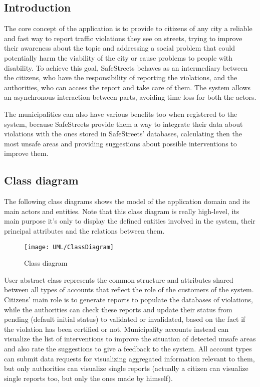 \subsection{Introduction}
The core concept of the application is to provide to citizens of any city a reliable and fast way to report traffic violations they see on streets, trying to improve their awareness about the topic and addressing a social problem that could potentially harm the viability of the city or cause problems to people with disability. To achieve this goal, SafeStreets behaves as an intermediary between the citizens, who have the responsibility of reporting the violations, and the authorities, who can access the report and take care of them. The system allows an asynchronous interaction between parts, avoiding time loss for both the actors.

The municipalities can also have various benefits too when registered to the system, because SafeStreets provide them a way to integrate their data about violations with the ones stored in SafeStreets' databases, calculating then the most unsafe areas and providing suggestions about possible interventions to improve them.

\subsection{Class diagram}

The following class diagrams shows the model of the application domain and its main actors and entities. Note that this class diagram is really high-level, its main purpose it's only to display the defined entities involved in the system, their principal attributes and the relations between them.

\begin{figure}[H]
	\centering
	\texttt{[image: UML/ClassDiagram]}
	\caption{Class diagram}
\end{figure}

User abstract class represents the common structure and attributes shared between all types of accounts that reflect the role of the customers of the system. Citizens' main role is to generate reports to populate the databases of violations, while the authorities can check these reports and update their status from pending (default initial status) to validated or invalidated, based on the fact if the violation has been certified or not. Municipality accounts instead can visualize the list of interventions to improve the situation of detected unsafe areas and also rate the suggestions to give a feedback to the system. All account types can submit data requests for visualizing aggregated information relevant to them, but only authorities can visualize single reports (actually a citizen can visualize single reports too, but only the ones made by himself).

